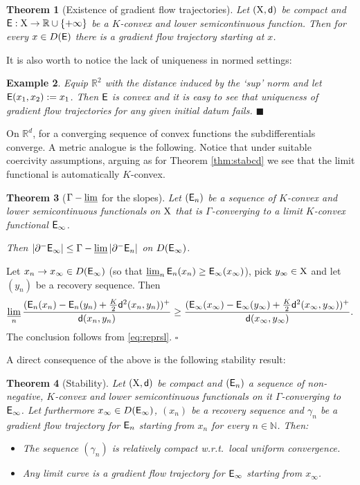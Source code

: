 \documentclass[11pt]{article}
\numberwithin{equation}{section}
\newtheorem{theorem}{Theorem}[section]
\newtheorem{example}[theorem]{Example}
\newenvironment{idea}{\removelastskip\par\medskip   %
\noindent{\em Idea of the proof} \rm}{\penalty-20\null\hfill$\square$\par\medbreak}
\newcommand{\N}{\mathbb{N}}
\newcommand{\R}{\mathbb{R}}
\newcommand{\X}{{\rm X}}
\newcommand{\sfd}{{\sf d}}
\newcommand{\limi}{\varliminf}
\newcommand{\E}{{\sf E}} %
\newcommand{\fr}{\penalty-20\null\hfill$\blacksquare$}         %
\begin{document}
\begin{theorem}[Existence of gradient flow trajectories]
Let $(\X,\sfd)$ be compact and $\E:\X\to\R\cup\{+\infty\}$ be a $K$-convex and lower semicontinuous function. Then for every $x\in D(\E)$ there is a gradient flow trajectory starting at $x$. 
\end{theorem}
It is also worth to notice the lack of uniqueness in normed settings:
\begin{example}\label{ex:nounique}{\rm
Equip  $\R^2$ with the distance induced by the `sup' norm and let $\E(x_1,x_2):=x_1$. Then $\E$ is convex and it is easy to see that uniqueness of gradient flow trajectories for any given initial datum fails.
}\fr\end{example}
On $\R^d$, for a converging sequence of convex functions the subdifferentials converge. A metric analogue  is the following. Notice that under suitable coercivity assumptions, arguing as for Theorem \ref{thm:stabcd} we see that the limit functional is automatically $K$-convex.
\begin{theorem}[$\Gamma-\limi$ for the slopes]\label{thm:glimisl}
Let   $(\E_n)$ be a sequence of $K$-convex and lower semicontinuous functionals on $\X$ that is $\Gamma$-converging to a limit $K$-convex functional $\E_\infty$. 

Then $|\partial^-\E_\infty|\leq \Gamma-\limi |\partial^-\E_n|$ on $D(\E_\infty)$.
\end{theorem}
\begin{idea} Let $x_n\to x_\infty\in D(\E_\infty)$ (so that $\limi_n\E_n(x_n)\geq\E_\infty(x_\infty)$), pick $y_\infty\in\X$ and let $(y_n)$ be a recovery sequence. Then 
\[
\limi_n\frac{(\E_n(x_n)-\E_n(y_n)+\frac K2\sfd^2(x_n,y_n))^+}{\sfd(x_n,y_n)}\geq \frac{(\E_\infty(x_\infty)-\E_\infty(y_\infty)+\frac K2\sfd^2(x_\infty,y_\infty))^+}{\sfd(x_\infty,y_\infty)}.
\] 
The conclusion follows from  \eqref{eq:reprsl}.
\end{idea}
A direct consequence of the above is the following stability result:
\begin{theorem}[Stability]\label{thm:stabede} Let $(\X,\sfd)$ be compact and $(\E_n)$ a sequence of non-negative, $K$-convex and lower semicontinuous functionals on it $\Gamma$-converging to $\E_\infty$. Let furthermore $x_\infty\in D(\E_\infty)$, $(x_n)$ be a recovery sequence and $\gamma_n$ be a gradient flow trajectory for $\E_n$ starting from $x_n$ for every $n\in\N$. Then:
\begin{itemize}
\item[i)] The sequence $(\gamma_n)$ is relatively compact w.r.t.\ local uniform convergence.
\item[ii)] Any limit curve is a gradient flow trajectory for $\E_\infty$ starting from $x_\infty$.
\end{itemize}
\end{theorem}
\end{document}
